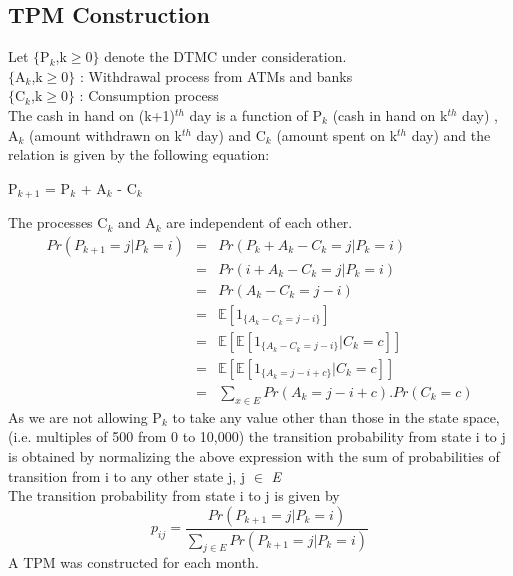 \documentclass[12pt]{article}
\begin{document}
\subsection{TPM Construction}
Let $\lbrace$P$_{k}$,k$\geq$0$\rbrace$ denote the DTMC under consideration.\\
$\lbrace$A$_{k}$,k$\geq$0$\rbrace$ : Withdrawal process from ATMs and banks\\ 
$\lbrace$C$_{k}$,k$\geq$0$\rbrace$ : Consumption process\\ 
The cash in hand on (k+1)$^{th}$ day is a function of P$_{k}$ (cash in hand on k$^{th}$ day) , A$_{k}$ (amount withdrawn on k$^{th}$ day) and  C$_{k}$ (amount spent on k$^{th}$ day) and the relation is given by the following equation:
\begin{center}
P$_{k+1}$ = P$_{k}$ + A$_{k}$ - C$_{k}$\\
\end{center}
The processes C$_{k}$ and A$_{k}$ are independent of each other.
\begin{eqnarray}
Pr(P_{k+1} = j | P_{k} = i)&=&Pr(P_{k} + A_{k} - C_{k} = j | P_{k} = i) \\
&=&Pr(  i + A_{k} - C_{k} = j | P_{k}  = i)\\
&=&Pr(  A_{k} - C_{k} = j-i )\\
&=&\mathbb{E} [ 1_{\lbrace A_{k} - C_{k} = j-i \rbrace} ] \\
&=&\mathbb{E}[\mathbb{E} [ 1_{\lbrace A_{k} - C_{k} = j-i \rbrace}|C_{k} = c ] ]\\
&=&\mathbb{E}[\mathbb{E}[1_{\lbrace A_{k} = j-i+c \rbrace}|C_{k} = c ]] \\
&=&\sum_{x\in\textit{E}} Pr(A_{k} = j-i+c).Pr(C_{k} = c)
\end{eqnarray}
As we are not allowing P$_{k}$ to take any value other than those in the state space,(i.e. multiples of 500 from 0 to 10,000) the transition probability from state i to j is obtained by normalizing the above expression with the sum of probabilities of transition from i to any other state j, j $\in$ \textit{E}\\
The transition probability from state i to j is given by
\begin{equation}
p_{ij} = \frac{Pr(P_{k+1} = j | P_{k} = i)}{\sum_{j\in\textit{E}}Pr(P_{k+1} = j | P_{k} = i)}
\end{equation}
A TPM was constructed for each month.
\end{document}
